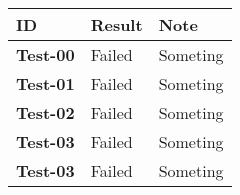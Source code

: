 \documentclass[../documentation.tex]{subfiles}
\begin{document}
\bgroup{}
\def\arraystretch{1.25}
\begin{center}
    \begin{tabular}{ |l|l|l| }
        \hline
        \textbf{ID} & Result & Note \\
        \hline
        \textbf{Test-00} & \color{red} Failed & Someting \\
        \hline
        \textbf{Test-01} & \color{red} Failed & Someting \\
        \hline
        \textbf{Test-02} & \color{red} Failed & Someting \\
        \hline
        \textbf{Test-03} & \color{red} Failed & Someting \\
        \hline
        \textbf{Test-03} & \color{red} Failed & Someting \\
        \hline
    \end{tabular}
\end{center}
\egroup{}
\end{document}
